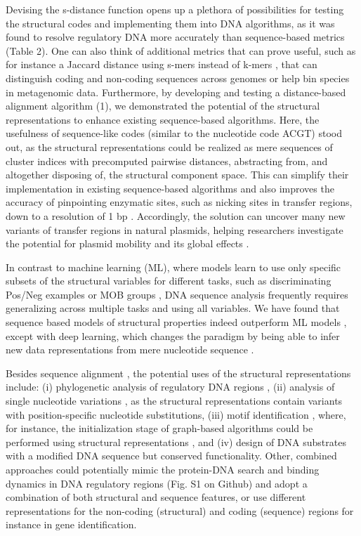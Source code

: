 \documentclass[sigconf]{acmart}
\begin{document}
Devising the s-distance function opens up a plethora of possibilities for testing the structural codes and implementing them into DNA algorithms, as it was found to resolve regulatory DNA more accurately than sequence-based metrics \cite{Zrimec2020-wx,Zrimec2018-lx} (Table 2). One can also think of additional metrics that can prove useful, such as for instance a Jaccard distance using s-mers instead of k-mers \cite{Zrimec2020-wx}, that can distinguish coding and non-coding sequences across genomes or help bin species in metagenomic data. Furthermore, by developing and testing a distance-based alignment algorithm (1), we demonstrated the potential of the structural representations to enhance existing sequence-based algorithms. Here, the usefulness of sequence-like codes (similar to the nucleotide code ACGT) stood out, as the structural representations could be realized as mere sequences of cluster indices with precomputed pairwise distances, abstracting from, and altogether disposing of, the structural component space. This can simplify their implementation in existing sequence-based algorithms and also improves the accuracy of pinpointing enzymatic sites, such as nicking sites in transfer regions, down to a resolution of 1 bp \cite{Zrimec2020-wx}. Accordingly, the solution can uncover many new variants of transfer regions in natural plasmids, helping researchers investigate the potential for plasmid mobility and its global effects \cite{Zrimec2020-wx}. 

In contrast to machine learning (ML), where models learn to use only specific subsets of the structural variables for different tasks, such as discriminating Pos/Neg examples or MOB groups \cite{Zrimec2015-xf,Zrimec2018-lx,Zrimec2013-ds}, DNA sequence analysis frequently requires generalizing across multiple tasks and using all variables. We have found that sequence based models of structural properties indeed outperform ML models \cite{Zrimec2020-wx,Zrimec2018-lx}, except with deep learning, which changes the paradigm by being able to infer new data representations from mere nucleotide sequence \cite{Zrimec2019-ql}.

Besides sequence alignment \cite{Zrimec2020-wx}, the potential uses of the structural representations include: (i) phylogenetic analysis of regulatory DNA regions \cite{Garcillan-Barcia2009-yk}, (ii) analysis of single nucleotide variations \cite{Watson2008-dt}, as the structural representations contain variants with position-specific nucleotide substitutions, (iii) motif identification \cite{Samee2019-xj}, where, for instance, the initialization stage of graph-based algorithms could be performed using structural representations \cite{Stepancic2014-yu}, and (iv) design of DNA substrates with a modified DNA sequence but conserved functionality. Other, combined approaches could potentially mimic the protein-DNA search and binding dynamics in DNA regulatory regions \cite{Marcovitz2013-kg,Levo2015-iu,Rohs2009-hm} (Fig. S1 on Github) and adopt a combination of both structural and sequence features, or use different representations for the non-coding (structural) and coding (sequence) regions for instance in gene identification.
\end{document}
